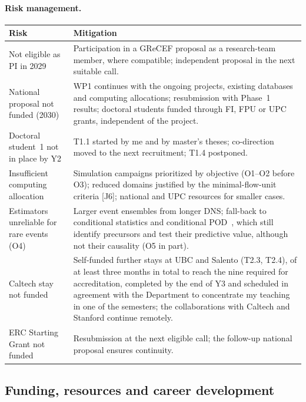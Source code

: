 \documentclass[11pt]{article}
\begin{document}
\paragraph{Risk management.}
\begin{center}\small
\begin{tabularx}{\textwidth}{@{}>{\raggedright\arraybackslash}p{4.4cm}X@{}}
\toprule
\textbf{Risk} & \textbf{Mitigation} \\
\midrule
Not eligible as PI in 2029 & Participation in a GReCEF proposal as a research-team member, where compatible; independent proposal in the next suitable call. \\
National proposal not funded (2030) & WP1 continues with the ongoing projects, existing databases and computing allocations; resubmission with Phase~1 results; doctoral students funded through FI, FPU or UPC grants, independent of the project. \\
Doctoral student~1 not in place by Y2 & T1.1 started by me and by master's theses; co-direction moved to the next recruitment; T1.4 postponed. \\
Insufficient computing allocation & Simulation campaigns prioritized by objective (O1--O2 before O3); reduced domains justified by the minimal-flow-unit criteria [J6]; national and UPC resources for smaller cases. \\
Estimators unreliable for rare events (O4) & Larger event ensembles from longer DNS; fall-back to conditional statistics and conditional POD~\cite{Martin2025}, which still identify precursors and test their predictive value, although not their causality (O5 in part). \\
Caltech stay not funded & Self-funded further stays at UBC and Salento (T2.3, T2.4), of at least three months in total to reach the nine required for accreditation, completed by the end of Y3 and scheduled in agreement with the Department to concentrate my teaching in one of the semesters; the collaborations with Caltech and Stanford continue remotely. \\
ERC Starting Grant not funded & Resubmission at the next eligible call; the follow-up national proposal ensures continuity. \\
\bottomrule
\end{tabularx}
\end{center}

\subsection{Funding, resources and career development}\label{sec:resources}
\end{document}
